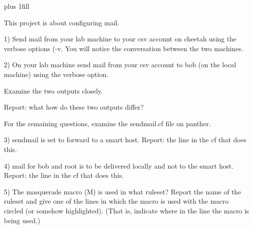 
\rightskip=0pt plus 1fill

\parindent 0pt

This project is about configuring mail.

1) Send mail from your lab machine to your csv account on {\ltt{}cheetah}
using the verbose options ({\ltt{}-v}.
You will notice the conversation between the two machines.

2) On your lab machine send mail from your csv account to bob (on the
local machine) using the verbose option.

Examine the two outputs closely.

Report: what how do these two outputs differ?

For the remaining questions, examine the {\ltt{}sendmail.cf}
file on {\ltt{}panther}.

3) sendmail is set to forward to a smart host.
Report: the line in the {\ltt{}cf} that does this.

4) mail for bob and root is to be delivered locally and not to the
smart host.
Report: the line in the {\ltt{}cf} that does this.

5) The masquerade macro ({\ltt{}M}) is used in what ruleset?
Report the name of the ruleset and give one of the lines
in which the macro is used with the macro circled (or
somehow highlighted).
(That is, indicate where in the line the macro is being used.)
\bye
